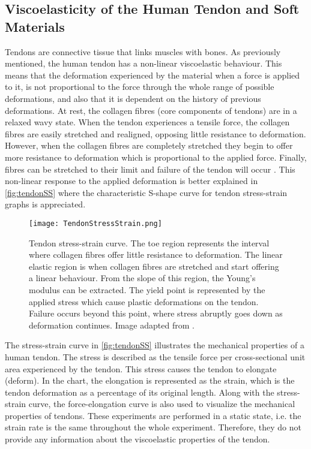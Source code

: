 \subsection{Viscoelasticity of the Human Tendon and Soft Materials}

Tendons are connective tissue that links muscles with bones. As previously mentioned, the human tendon has a non-linear viscoelastic behaviour. This means that the deformation experienced by the material when a force is applied to it, is not proportional to the force through the whole range of possible deformations, and also that it is dependent on the history of previous deformations. At rest, the collagen fibres (core components of tendons) are in a relaxed wavy state. When the tendon experiences a tensile force, the collagen fibres are easily stretched and realigned, opposing little resistance to deformation. However, when the collagen fibres are completely stretched they begin to offer more resistance to deformation which is proportional to the applied force. Finally, fibres can be stretched to their limit and failure of the tendon will occur \cite{nordin2001basic}. This non-linear response to the applied deformation is better explained in \autoref{fig:tendonSS} where the characteristic S-shape curve for tendon stress-strain graphs is appreciated.

\begin{figure}[htb!]
    \centering
    \texttt{[image: TendonStressStrain.png]}
    \caption{Tendon stress-strain curve. The toe region represents the interval where collagen fibres offer little resistance to deformation. The linear elastic region is when collagen fibres are stretched and start offering a linear behaviour. From the slope of this region, the Young's modulus can be extracted. The yield point is represented by the applied stress which cause plastic deformations on the tendon. Failure occurs beyond this point, where stress abruptly goes down as deformation continues. Image adapted from \cite{maurel1998biomechanical}. }
    \label{fig:tendonSS}
\end{figure}

The stress-strain curve in \autoref{fig:tendonSS} illustrates the mechanical properties of a human tendon. The stress is described as the tensile force per cross-sectional unit area experienced by the tendon. This stress causes the tendon to elongate (deform). In the chart, the elongation is represented as the strain, which is the tendon deformation as a percentage of its original length. Along with the stress-strain curve, the force-elongation curve is also used to visualize the mechanical properties of tendons. These experiments are performed in a static state, i.e. the strain rate is the same throughout the whole experiment. Therefore, they do not provide any information about the viscoelastic properties of the tendon.


